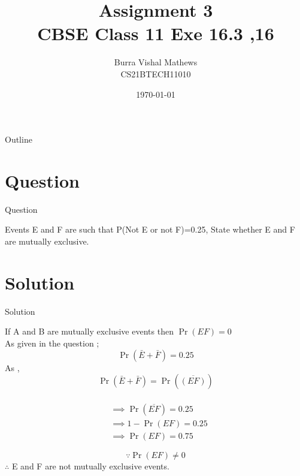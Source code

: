 \documentclass{beamer}
\title{Assignment 3 \\ CBSE Class 11 Exe 16.3 ,16}
\author{Burra Vishal Mathews \\ CS21BTECH11010}
\date{\today}
\providecommand{\pr}[1]{\ensuremath{\Pr\left(#1\right)}}
\begin{document}
\begin{frame}
    \titlepage 
\end{frame}

\logo{}


\begin{frame}{Outline}
    \tableofcontents
\end{frame}


\section{Question}
\begin{frame}{Question}

Events E and F are such that P(Not E or not F)=0.25, State whether E and F are mutually exclusive.

\end{frame}


\section{Solution}
\begin{frame}{Solution}

    If A and B are mutually exclusive events then $\pr{EF}=0$\\
    As given in the question ;
    $$\pr{\bar E+\bar F}=0.25 $$
    As , $$\pr{\bar E+\bar F}=\pr{\overline{( E F)}}$$\\
    
    \begin{align}
        &\implies \pr{\overline{E F}}=0.25\\
        &\implies 1-\pr{EF}=0.25\\
        &\implies \pr{EF}=0.75
    \end{align}
    
\end{frame} 

\begin{frame}
    $$\because \pr{EF}\neq 0$$
    $\therefore$ E and F are not mutually exclusive events.

    
\end{frame}
\end{document}
